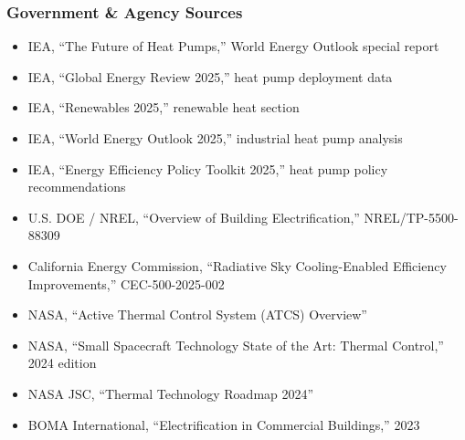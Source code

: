 \documentclass[11pt,letterpaper]{article}
\begin{document}
\subsubsection{Government \& Agency Sources}
\begin{itemize}[leftmargin=2em]
\item IEA, ``The Future of Heat Pumps,'' World Energy Outlook special report
\item IEA, ``Global Energy Review 2025,'' heat pump deployment data
\item IEA, ``Renewables 2025,'' renewable heat section
\item IEA, ``World Energy Outlook 2025,'' industrial heat pump analysis
\item IEA, ``Energy Efficiency Policy Toolkit 2025,'' heat pump policy recommendations
\item U.S. DOE / NREL, ``Overview of Building Electrification,'' NREL/TP-5500-88309
\item California Energy Commission, ``Radiative Sky Cooling-Enabled Efficiency Improvements,'' CEC-500-2025-002
\item NASA, ``Active Thermal Control System (ATCS) Overview''
\item NASA, ``Small Spacecraft Technology State of the Art: Thermal Control,'' 2024 edition
\item NASA JSC, ``Thermal Technology Roadmap 2024''
\item BOMA International, ``Electrification in Commercial Buildings,'' 2023
\end{itemize}
\end{document}
